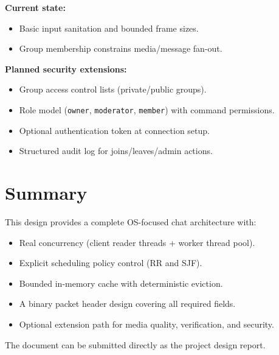 \documentclass[12pt,letterpaper]{article}
\begin{document}
\noindent\textbf{Current state:}
\begin{itemize}[leftmargin=1.5em]
  \item Basic input sanitation and bounded frame sizes.
  \item Group membership constrains media/message fan-out.
\end{itemize}

\noindent\textbf{Planned security extensions:}
\begin{itemize}[leftmargin=1.5em]
  \item Group access control lists (private/public groups).
  \item Role model (\texttt{owner}, \texttt{moderator}, \texttt{member}) with command permissions.
  \item Optional authentication token at connection setup.
  \item Structured audit log for joins/leaves/admin actions.
\end{itemize}

\section{Summary}

This design provides a complete OS-focused chat architecture with:

\begin{itemize}[leftmargin=1.5em]
  \item Real concurrency (client reader threads + worker thread pool).
  \item Explicit scheduling policy control (RR and SJF).
  \item Bounded in-memory cache with deterministic eviction.
  \item A binary packet header design covering all required fields.
  \item Optional extension path for media quality, verification, and security.
\end{itemize}

\medskip
\noindent The document can be submitted directly as the project design report.
\end{document}
